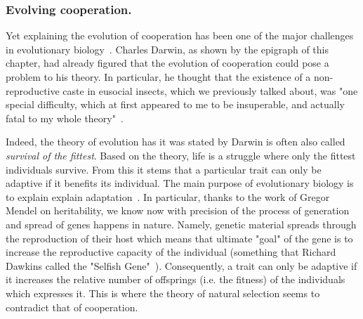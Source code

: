     \subsubsection{Evolving cooperation.} Yet explaining the evolution of cooperation has been one of the major challenges in evolutionary biology~\parencite{Hamilton1964, Dugatkin2002, West2011a}. Charles Darwin, as shown by the epigraph of this chapter, had already figured that the evolution of cooperation could pose a problem to his theory. In particular, he thought that the existence of a non-reproductive caste in eusocial insects, which we previously talked about, was "one special difficulty, which at first appeared to me to be insuperable, and actually fatal to my whole theory"~\parencite{Darwin1859}. 

    Indeed, the theory of evolution has it was stated by Darwin is often also called \emph{survival of the fittest}. Based on the theory, life is a struggle where only the fittest individuals survive. From this it stems that a particular trait can only be adaptive if it benefits its individual. The main purpose of evolutionary biology is to explain explain adaptation~\parencite{West2011a}. In particular, thanks to the work of Gregor Mendel on heritability, we know now with precision of the process of generation and spread of genes happens in nature. Namely, genetic material spreads through the reproduction of their host which means that ultimate "goal" of the gene is to increase the reproductive capacity of the individual (something that Richard Dawkins called the "Selfish Gene"~\parencite{Dawkins1976}). Consequently, a trait can only be adaptive if it increases the relative number of offsprings (i.e. the fitness) of the individuals which expresses it. This is where the theory of natural selection seems to contradict that of cooperation. 

